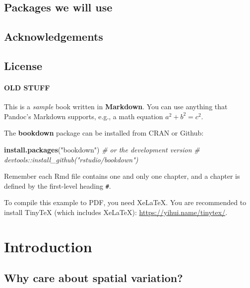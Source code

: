 \documentclass[]{book}
\newenvironment{Shaded}{\begin{snugshade}}{\end{snugshade}}
\newcommand{\CommentTok}[1]{\textcolor[rgb]{0.56,0.35,0.01}{\textit{#1}}}
\newcommand{\KeywordTok}[1]{\textcolor[rgb]{0.13,0.29,0.53}{\textbf{#1}}}
\newcommand{\NormalTok}[1]{#1}
\newcommand{\StringTok}[1]{\textcolor[rgb]{0.31,0.60,0.02}{#1}}
\begin{document}
\hypertarget{packages-we-will-use}{%
\section{Packages we will use}\label{packages-we-will-use}}

\hypertarget{acknowledgements}{%
\section{Acknowledgements}\label{acknowledgements}}

\hypertarget{license}{%
\section{License}\label{license}}

\hypertarget{old-stuff}{%
\subsubsection{OLD STUFF}\label{old-stuff}}

This is a \emph{sample} book written in \textbf{Markdown}. You can use anything that Pandoc's Markdown supports, e.g., a math equation \(a^2 + b^2 = c^2\).

The \textbf{bookdown} package can be installed from CRAN or Github:

\begin{Shaded}
\begin{Highlighting}[]
\KeywordTok{install.packages}\NormalTok{(}\StringTok{"bookdown"}\NormalTok{)}
\CommentTok{# or the development version}
\CommentTok{# devtools::install_github("rstudio/bookdown")}
\end{Highlighting}
\end{Shaded}

Remember each Rmd file contains one and only one chapter, and a chapter is defined by the first-level heading \texttt{\#}.

To compile this example to PDF, you need XeLaTeX. You are recommended to install TinyTeX (which includes XeLaTeX): \url{https://yihui.name/tinytex/}.

\hypertarget{intro}{%
\chapter{Introduction}\label{intro}}

\hypertarget{why-care-about-spatial-variation}{%
\section{Why care about spatial variation?}\label{why-care-about-spatial-variation}}
\end{document}
